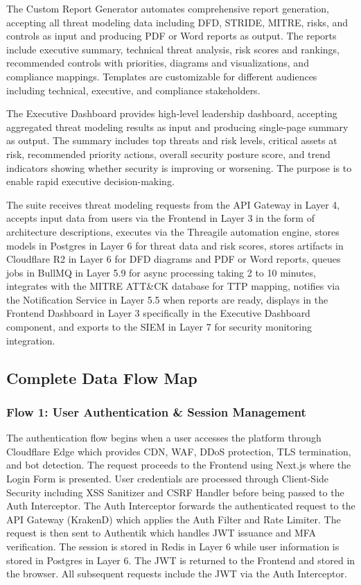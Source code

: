 \documentclass[12pt,a4paper]{report}
\begin{document}
The Custom Report Generator automates comprehensive report generation, accepting all threat modeling data including DFD, STRIDE, MITRE, risks, and controls as input and producing PDF or Word reports as output. The reports include executive summary, technical threat analysis, risk scores and rankings, recommended controls with priorities, diagrams and visualizations, and compliance mappings. Templates are customizable for different audiences including technical, executive, and compliance stakeholders.

The Executive Dashboard provides high-level leadership dashboard, accepting aggregated threat modeling results as input and producing single-page summary as output. The summary includes top threats and risk levels, critical assets at risk, recommended priority actions, overall security posture score, and trend indicators showing whether security is improving or worsening. The purpose is to enable rapid executive decision-making.

The suite receives threat modeling requests from the API Gateway in Layer 4, accepts input data from users via the Frontend in Layer 3 in the form of architecture descriptions, executes via the Threagile automation engine, stores models in Postgres in Layer 6 for threat data and risk scores, stores artifacts in Cloudflare R2 in Layer 6 for DFD diagrams and PDF or Word reports, queues jobs in BullMQ in Layer 5.9 for async processing taking 2 to 10 minutes, integrates with the MITRE ATT\&CK database for TTP mapping, notifies via the Notification Service in Layer 5.5 when reports are ready, displays in the Frontend Dashboard in Layer 3 specifically in the Executive Dashboard component, and exports to the SIEM in Layer 7 for security monitoring integration.

\subsection{Complete Data Flow Map}

\subsubsection{Flow 1: User Authentication \& Session Management}

The authentication flow begins when a user accesses the platform through Cloudflare Edge which provides CDN, WAF, DDoS protection, TLS termination, and bot detection. The request proceeds to the Frontend using Next.js where the Login Form is presented. User credentials are processed through Client-Side Security including XSS Sanitizer and CSRF Handler before being passed to the Auth Interceptor. The Auth Interceptor forwards the authenticated request to the API Gateway (KrakenD) which applies the Auth Filter and Rate Limiter. The request is then sent to Authentik which handles JWT issuance and MFA verification. The session is stored in Redis in Layer 6 while user information is stored in Postgres in Layer 6. The JWT is returned to the Frontend and stored in the browser. All subsequent requests include the JWT via the Auth Interceptor.
\end{document}
